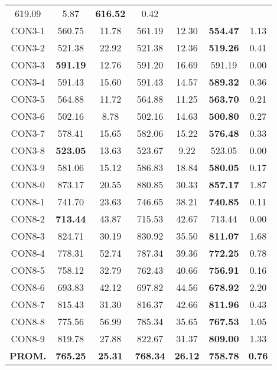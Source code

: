 \begin{table}[ht]
\begin{tabular}{c c c c c c c}
619.09 & 5.87 & \bf{616.52} & 
0.42\\CON3-1 & 560.75 & 11.78 & 
561.19 & 12.30 & \bf{554.47} & 
1.13\\CON3-2 & 521.38 & 22.92 & 
521.38 & 12.36 & \bf{519.26} & 
0.41\\CON3-3 & \bf{591.19} & 12.76 & 
591.20 & 16.69 & 591.19 & 0.00\\
CON3-4 & 591.43 & 15.60 & 
591.43 & 14.57 & \bf{589.32} & 
0.36\\CON3-5 & 564.88 & 11.72 & 
564.88 & 11.25 & \bf{563.70} & 
0.21\\CON3-6 & 502.16 & 8.78 & 
502.16 & 14.63 & \bf{500.80} & 
0.27\\CON3-7 & 578.41 & 15.65 & 
582.06 & 15.22 & \bf{576.48} & 
0.33\\CON3-8 & \bf{523.05} & 13.63 & 
523.67 & 9.22 & 523.05 & 0.00\\
CON3-9 & 581.06 & 15.12 & 
586.83 & 18.84 & \bf{580.05} & 
0.17\\CON8-0 & 873.17 & 20.55 & 
880.85 & 30.33 & \bf{857.17} & 
1.87\\CON8-1 & 741.70 & 23.63 & 
746.65 & 38.21 & \bf{740.85} & 
0.11\\CON8-2 & \bf{713.44} & 43.87 & 
715.53 & 42.67 & 713.44 & 0.00\\
CON8-3 & 824.71 & 30.19 & 
830.92 & 35.50 & \bf{811.07} & 
1.68\\CON8-4 & 778.31 & 52.74 & 
787.34 & 39.36 & \bf{772.25} & 
0.78\\CON8-5 & 758.12 & 32.79 & 
762.43 & 40.66 & \bf{756.91} & 
0.16\\CON8-6 & 693.83 & 42.12 & 
697.82 & 44.56 & \bf{678.92} & 
2.20\\CON8-7 & 815.43 & 31.30 & 
816.37 & 42.66 & \bf{811.96} & 
0.43\\CON8-8 & 775.56 & 56.99 & 
785.34 & 35.65 & \bf{767.53} & 
1.05\\CON8-9 & 819.78 & 27.88 & 
822.67 & 31.37 & \bf{809.00} & 
1.33\\\bf{PROM.} & 
\bf{765.25} & \bf{25.31} & \bf{768.34} & \bf{26.12} & \bf{758.78} & \bf{0.76}\\[1ex]\hline
\end{tabular}
\label{table:nonlin}
\end{table} \clearpage
